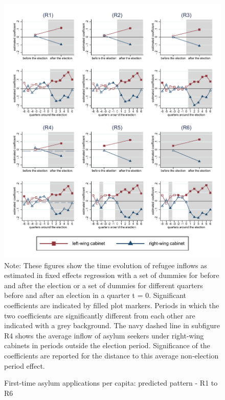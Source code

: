 \documentclass[11pt,a4paper]{scrartcl}
\begin{document}
\clearpage
\FloatBarrier




\clearpage
\FloatBarrier
\begin{figure}[!ht]
	\caption{First-time asylum applications per capita: predicted pattern - R1 to R6}
	\includegraphics[width=1\textwidth]{../results/applications/app_graphs_R1-R6.pdf}
	\scriptsize{Note: These figures show the time evolution of refugee inflows as estimated in fixed effects regression
		with a set of dummies for before and after the election or a set of dummies for different quarters before and after an election in a quarter t = 0. Significant coefficients are indicated by filled plot markers. Periods in which the two coefficients are significantly different from each other are indicated with a grey background. The navy dashed line in subfigure R4 shows the average inflow of asylum seekers under right-wing cabinets in periods outside the election period. Significance of the coefficients are reported for the distance to this average non-election period effect.}
\end{figure}
\end{document}

